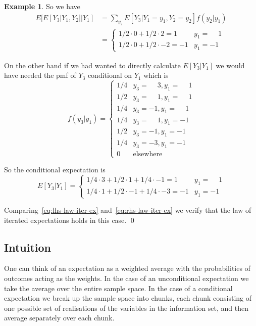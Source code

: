 \documentclass[12pt,reqno,openany]{amsbook}
\theoremstyle{plain}
\theoremstyle{definition}
\newtheorem{exmp}{Example}[chapter]
\begin{document}
\begin{exmp}
So we have
\begin{align}\label{eq:lhs-law-iter-ex}
E[E[Y_3|Y_1,Y_2]|Y_1]&=\sum_{y_2}E[Y_3|Y_1=y_1,Y_2=y_2]f(y_2|y_1)\\
&=\begin{cases}
1/2\cdot 0+1/2 \cdot 2=1 & y_1=\phantom{-}1\\
1/2\cdot 0+1/2\cdot -2=-1 &y_1=-1
\end{cases}
\end{align}

On the other hand if we had wanted to directly calculate $E[Y_3|Y_1]$
we would have needed the pmf of $Y_3$ conditional on $Y_1$ which is
\[f(y_3|y_1)=
\begin{cases}
1/4 & y_3=\phantom{-}3,y_1=\phantom{-}1\\
1/2 & y_3=\phantom{-}1,y_1=\phantom{-}1\\
1/4 & y_3=-1,y_1=\phantom{-}1\\
1/4 & y_3=\phantom{-}1,y_1=-1\\
1/2 & y_3=-1,y_1=-1\\
1/4 & y_3=-3,y_1=-1\\
0 & \text{elsewhere}
\end{cases}\]

So the conditional expectation is
\begin{equation}\label{eq:rhs-law-iter-ex}
E[Y_3|Y_1]=\begin{cases}
1/4\cdot 3+1/2 \cdot 1 +1/4\cdot -1 =1&y_1=\phantom{-}1\\
1/4\cdot 1+1/2 \cdot -1+1/4\cdot -3 =-1&y_1=-1
\end{cases}
\end{equation}

Comparing~\eqref{eq:lhs-law-iter-ex} and~\eqref{eq:rhs-law-iter-ex} we
verify that the law of iterated expectations holds in this case.
\qed
\end{exmp}

\subsection{Intuition}
One can think of an expectation as a weighted average with the
probabilities of outcomes acting as the weights. In the case of an
unconditional expectation we take the average over the entire sample
space. In the case of a conditional expectation we break up the sample
space into chunks, each chunk consisting of one possible set of
realisations of the variables in the information set, and then average
separately over each chunk. 
\end{document}
